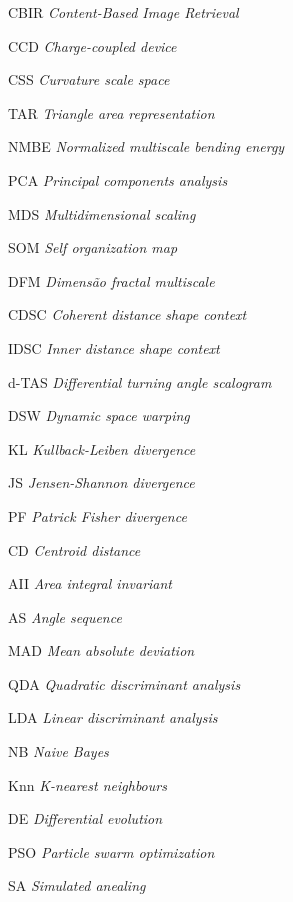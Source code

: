 \documentclass[
	12pt,				%
	openright,			%
	twoside,			%
	a4paper,			%
	english,			%
  	brazil				%
	]{abntex2}
\begin{document}

\listoffigures*
\cleardoublepage

\listoftables*
\cleardoublepage

\begin{siglas}
  \item[CBIR] \textit{Content-Based Image Retrieval}
\item[CCD] \textit{Charge-coupled device}
\item[CSS] \textit{Curvature scale space}
\item[TAR] \textit{Triangle area representation}
\item[NMBE] \textit{Normalized multiscale bending energy}
\item[PCA] \textit{Principal components analysis}
\item[MDS] \textit{Multidimensional scaling}
\item[SOM] \textit{Self organization map}
\item[DFM] \textit{Dimensão fractal multiscale}
\item[CDSC] \textit{Coherent distance shape context}
\item[IDSC] \textit{Inner distance shape context}
\item[d-TAS] \textit{Differential turning angle scalogram}
\item[DSW] \textit{Dynamic space warping}
\item[KL] \textit{Kullback-Leiben divergence}
\item[JS] \textit{Jensen-Shannon divergence}
\item[PF] \textit{Patrick Fisher divergence}
\item[CD] \textit{Centroid distance}
\item[AII] \textit{Area integral invariant}
\item[AS] \textit{Angle sequence}
\item[MAD] \textit{Mean absolute deviation}
\item[QDA] \textit{Quadratic discriminant analysis}
\item[LDA] \textit{Linear discriminant analysis}
\item[NB] \textit{Naive Bayes}
\item[Knn] \textit{K-nearest neighbours}
\item[DE] \textit{Differential evolution}
\item[PSO] \textit{Particle swarm optimization}
\item[SA] \textit{Simulated anealing}  
\end{siglas}
\end{document}
